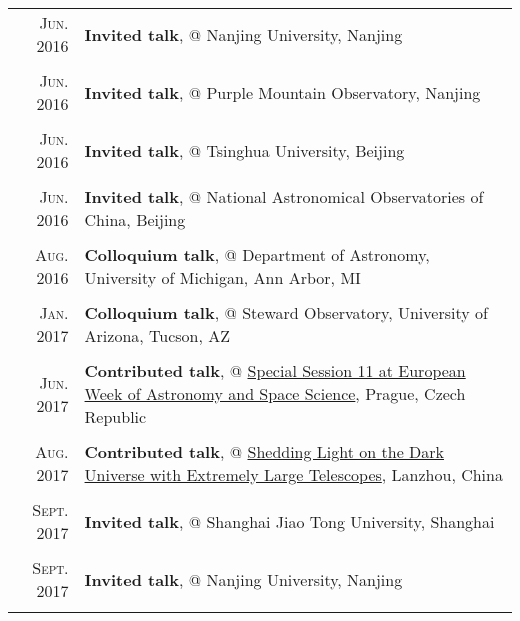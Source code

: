 \documentclass[letterpaper,10pt]{article}
\begin{document}
\begin{longtable}{r|p{5.5in}}
    \textsc{Jun. 2016}   &   \textbf{Invited talk}, @ Nanjing University, Nanjing \\
    \multicolumn{2}{c}{} \\

    \textsc{Jun. 2016}   &   \textbf{Invited talk}, @ Purple Mountain Observatory, Nanjing \\
    \multicolumn{2}{c}{} \\

    \textsc{Jun. 2016}   &   \textbf{Invited talk}, @ Tsinghua University, Beijing \\
    \multicolumn{2}{c}{} \\

    \textsc{Jun. 2016}   &   \textbf{Invited talk}, @ National Astronomical Observatories of China, Beijing   \\
    \multicolumn{2}{c}{} \\

    \textsc{Aug. 2016}   &   \textbf{Colloquium talk}, @ Department of Astronomy, University of Michigan, Ann Arbor, MI \\
    \multicolumn{2}{c}{} \\

    \textsc{Jan. 2017}   &   \textbf{Colloquium talk}, @ Steward Observatory, University of Arizona, Tucson, AZ \\
    \multicolumn{2}{c}{} \\

    \textsc{Jun. 2017}   &   \textbf{Contributed talk}, @ 
    \href{http://eas.unige.ch/EWASS2017/session.jsp?id=SS11}{Special Session 11 at 
    European Week of Astronomy and Space Science}, Prague, Czech Republic   \\
    \multicolumn{2}{c}{} \\

    \textsc{Aug. 2017}   &   \textbf{Contributed talk}, @
    \href{http://darkuniverse2017.csp.escience.cn/dct/page/65580}{Shedding Light on 
    the Dark Universe with Extremely Large Telescopes}, Lanzhou, China      \\
    \multicolumn{2}{c}{} \\

    \textsc{Sept. 2017}   &   \textbf{Invited talk}, @ Shanghai Jiao Tong University, Shanghai \\
    \multicolumn{2}{c}{} \\

    \textsc{Sept. 2017}   &   \textbf{Invited talk}, @ Nanjing University, Nanjing \\
    \multicolumn{2}{c}{} \\


\end{longtable}
\end{document}
